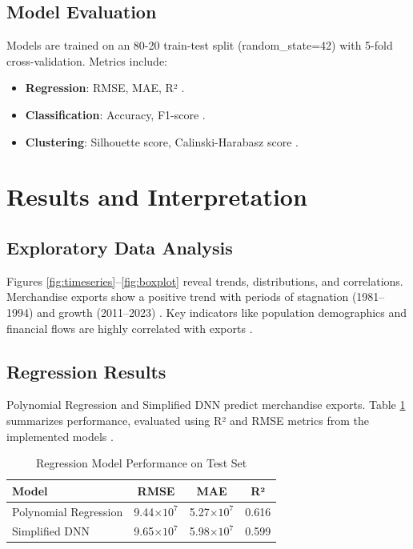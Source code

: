 \documentclass[12pt]{article}
\begin{document}
	\subsection{Model Evaluation}
	Models are trained on an 80-20 train-test split (random\_state=42) with 5-fold cross-validation. Metrics include:
	\begin{itemize}
		\item \textbf{Regression}: RMSE, MAE, R² \citep{hastie2009}.
		\item \textbf{Classification}: Accuracy, F1-score \citep{hastie2009}.
		\item \textbf{Clustering}: Silhouette score, Calinski-Harabasz score \citep{hastie2009}.
	\end{itemize}
	
	\section{Results and Interpretation}
	
	\subsection{Exploratory Data Analysis}
	Figures \ref{fig:timeseries}–\ref{fig:boxplot} reveal trends, distributions, and correlations. Merchandise exports show a positive trend with periods of stagnation (1981–1994) and growth (2011–2023) \citep{un2020}. Key indicators like population demographics and financial flows are highly correlated with exports \citep{hastie2009}.
	
	\subsection{Regression Results}
	Polynomial Regression and Simplified DNN predict merchandise exports. Table \ref{tab:regression_results} summarizes performance, evaluated using R² and RMSE metrics from the implemented models \citep{hastie2009}.
	
	\begin{table}[H]
		\centering
		\caption{Regression Model Performance on Test Set}
		\begin{tabular}{lccc}
			\toprule
			Model & RMSE & MAE & R² \\
			\midrule
			Polynomial Regression & 9.44$\times 10^7$ & 5.27$\times 10^7$ & 0.616 \\
			Simplified DNN & 9.65$\times 10^7$ & 5.98$\times 10^7$ & 0.599 \\
			\bottomrule
		\end{tabular}
		\label{tab:regression_results}
	\end{table}
	
\end{document}
